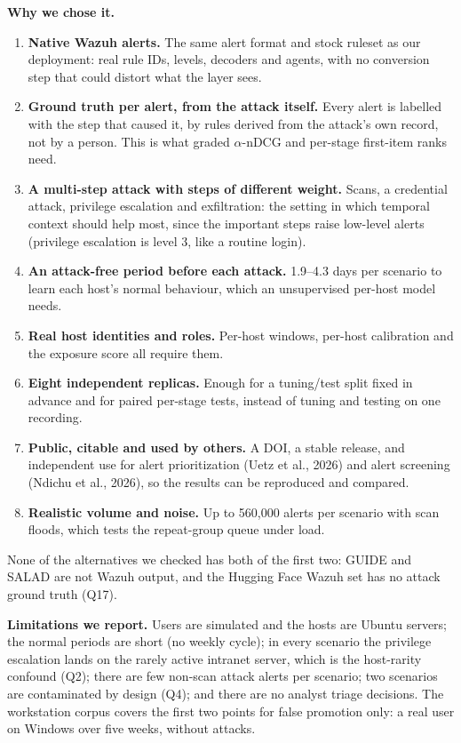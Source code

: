 \documentclass[10.5pt,a4paper]{article}
\newcommand{\sub}[1]{\par\smallskip\noindent\textbf{#1}\quad}
\begin{document}
\sub{Why we chose it.}
\begin{enumerate}
\item \textbf{Native Wazuh alerts.} The same alert format and stock ruleset as our deployment: real rule IDs, levels, decoders and agents, with no conversion step that could distort what the layer sees.
\item \textbf{Ground truth per alert, from the attack itself.} Every alert is labelled with the step that caused it, by rules derived from the attack's own record, not by a person. This is what graded $\alpha$-nDCG and per-stage first-item ranks need.
\item \textbf{A multi-step attack with steps of different weight.} Scans, a credential attack, privilege escalation and exfiltration: the setting in which temporal context should help most, since the important steps raise low-level alerts (privilege escalation is level 3, like a routine login).
\item \textbf{An attack-free period before each attack.} 1.9--4.3 days per scenario to learn each host's normal behaviour, which an unsupervised per-host model needs.
\item \textbf{Real host identities and roles.} Per-host windows, per-host calibration and the exposure score all require them.
\item \textbf{Eight independent replicas.} Enough for a tuning/test split fixed in advance and for paired per-stage tests, instead of tuning and testing on one recording.
\item \textbf{Public, citable and used by others.} A DOI, a stable release, and independent use for alert prioritization (Uetz et al., 2026) and alert screening (Ndichu et al., 2026), so the results can be reproduced and compared.
\item \textbf{Realistic volume and noise.} Up to 560{,}000 alerts per scenario with scan floods, which tests the repeat-group queue under load.
\end{enumerate}
None of the alternatives we checked has both of the first two: GUIDE and SALAD are not Wazuh output, and the Hugging Face Wazuh set has no attack ground truth (Q17).

\sub{Limitations we report.} Users are simulated and the hosts are Ubuntu servers; the normal periods are short (no weekly cycle); in every scenario the privilege escalation lands on the rarely active intranet server, which is the host-rarity confound (Q2); there are few non-scan attack alerts per scenario; two scenarios are contaminated by design (Q4); and there are no analyst triage decisions. The workstation corpus covers the first two points for false promotion only: a real user on Windows over five weeks, without attacks.
\end{document}
